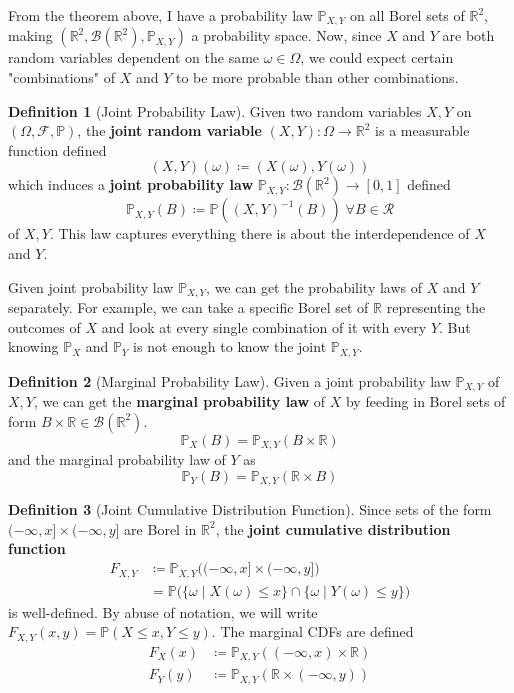 \documentclass{article}
\theoremstyle{definition}
\theoremstyle{remark}
\theoremstyle{definition}
\newtheorem{definition}{Definition}[section]
\begin{document}
From the theorem above, I have a probability law $\mathbb{P}_{X, Y}$ on all Borel sets of $\mathbb{R}^2$, making $(\mathbb{R}^2, \mathcal{B}(\mathbb{R}^2), \mathbb{P}_{X, Y})$ a probability space. Now, since $X$ and $Y$ are both random variables dependent on the same $\omega \in \Omega$, we could expect certain "combinations" of $X$ and $Y$ to be more probable than other combinations. 

\begin{definition}[Joint Probability Law]
Given two random variables $X, Y$ on $(\Omega, \mathcal{F}, \mathbb{P})$, the \textbf{joint random variable} $(X, Y): \Omega \longrightarrow \mathbb{R}^2$ is a measurable function defined 
\[(X, Y) (\omega) \coloneqq (X(\omega), Y(\omega))\]
which induces a \textbf{joint probability law} $\mathbb{P}_{X, Y}: \mathcal{B}(\mathbb{R}^2) \longrightarrow [0, 1]$ defined 
\[\mathbb{P}_{X, Y}(B) \coloneqq \mathbb{P}((X, Y)^{-1}(B)) \; \forall B \in \mathcal{R}\]
of $X, Y$. This law captures everything there is about the interdependence of $X$ and $Y$. 
\end{definition}

Given joint probability law $\mathbb{P}_{X, Y}$, we can get the probability laws of $X$ and $Y$ separately. For example, we can take a specific Borel set of $\mathbb{R}$ representing the outcomes of $X$ and look at every single combination of it with every $Y$. But knowing $\mathbb{P}_X$ and $\mathbb{P}_Y$ is not enough to know the joint $\mathbb{P}_{X, Y}$. 

\begin{definition}[Marginal Probability Law]
Given a joint probability law $\mathbb{P}_{X, Y}$ of $X, Y$, we can get the \textbf{marginal probability law} of $X$ by feeding in Borel sets of form $B \times \mathbb{R} \in \mathcal{B}(\mathbb{R}^2)$. 
\[\mathbb{P}_X (B) = \mathbb{P}_{X, Y} (B \times \mathbb{R})\]
and the marginal probability law of $Y$ as 
\[\mathbb{P}_Y (B) = \mathbb{P}_{X, Y} (\mathbb{R} \times B)\]
\end{definition}

\begin{definition}[Joint Cumulative Distribution Function]
Since sets of the form $(-\infty, x] \times (-\infty, y]$ are Borel in $\mathbb{R}^2$, the \textbf{joint cumulative distribution function} 
\begin{align*}
    F_{X, Y} & \coloneqq \mathbb{P}_{X, Y} \big( (-\infty, x] \times (-\infty, y] \big) \\
    & = \mathbb{P} \big( \{\omega \mid X(\omega) \leq x\} \cap \{ \omega \mid Y(\omega) \leq y\} \big)
\end{align*}
is well-defined. By abuse of notation, we will write $F_{X, Y} (x, y) = \mathbb{P}(X \leq x, Y \leq y)$. The marginal CDFs are defined 
\begin{align*}
    F_X (x) & \coloneqq \mathbb{P}_{X, Y} ((-\infty, x) \times \mathbb{R}) \\
    F_Y (y) & \coloneqq \mathbb{P}_{X, Y} (\mathbb{R} \times (-\infty, y))
\end{align*}
\end{definition}
\end{document}

